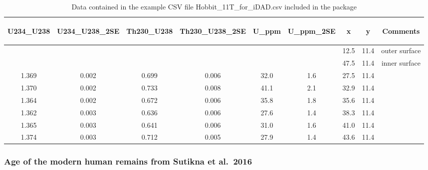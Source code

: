 \documentclass[]{elsarticle} %
\begin{document}
\begin{table}[ht]
\centering
\begin{tabular}{ccccccccc}
  \hline
\begin{sideways} U234\_U238 \end{sideways} & \begin{sideways} U234\_U238\_2SE \end{sideways} & \begin{sideways} Th230\_U238 \end{sideways} & \begin{sideways} Th230\_U238\_2SE \end{sideways} & \begin{sideways} U\_ppm \end{sideways} & \begin{sideways} U\_ppm\_2SE \end{sideways} & \begin{sideways} x \end{sideways} & \begin{sideways} y \end{sideways} & \begin{sideways} Comments \end{sideways} \\ 
  \hline
 &  &  &  &  &  & 12.5 & 11.4 & outer surface \\ 
   &  &  &  &  &  & 47.5 & 11.4 & inner surface \\ 
  1.369 & 0.002 & 0.699 & 0.006 & 32.0 & 1.6 & 27.5 & 11.4 &  \\ 
  1.370 & 0.002 & 0.733 & 0.008 & 41.1 & 2.1 & 32.9 & 11.4 &  \\ 
  1.364 & 0.002 & 0.672 & 0.006 & 35.8 & 1.8 & 35.6 & 11.4 &  \\ 
  1.362 & 0.003 & 0.636 & 0.006 & 27.6 & 1.4 & 38.3 & 11.4 &  \\ 
  1.365 & 0.003 & 0.641 & 0.006 & 31.0 & 1.6 & 41.0 & 11.4 &  \\ 
  1.374 & 0.003 & 0.712 & 0.005 & 27.9 & 1.4 & 43.6 & 11.4 &  \\ 
   \hline
\end{tabular}
\caption{\label{tab:table-human}Data contained in the example CSV file Hobbit\_1\-1T\_for\_iDAD.csv included in the package} 
\end{table}

\hypertarget{age-of-the-modern-human-remains-from-sutikna-et-al.-2016}{%
\subsubsection{Age of the modern human remains from Sutikna et al.~2016}\label{age-of-the-modern-human-remains-from-sutikna-et-al.-2016}}
\end{document}
